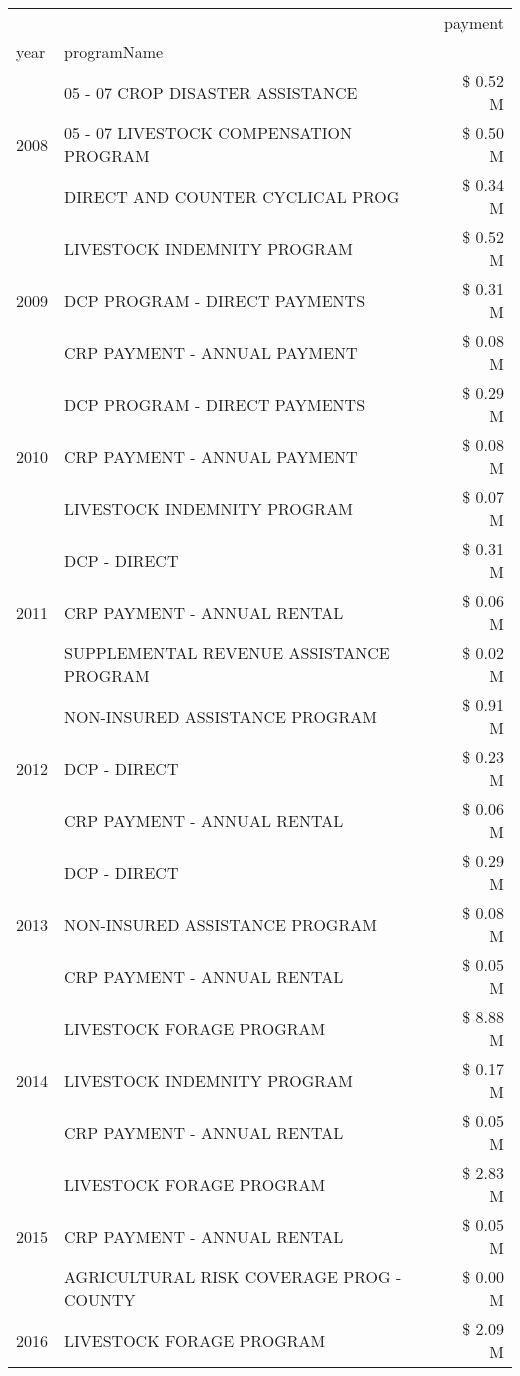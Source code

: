 \begin{tabular}{llr}
\toprule
 &  & payment \\
year & programName &  \\
\midrule
\multirow[t]{3}{*}{2008} & 05 - 07 CROP DISASTER ASSISTANCE & \$ 0.52 M \\
 & 05 - 07 LIVESTOCK COMPENSATION PROGRAM & \$ 0.50 M \\
 & DIRECT AND COUNTER CYCLICAL PROG & \$ 0.34 M \\
\cline{1-3}
\multirow[t]{3}{*}{2009} & LIVESTOCK INDEMNITY PROGRAM & \$ 0.52 M \\
 & DCP PROGRAM - DIRECT PAYMENTS & \$ 0.31 M \\
 & CRP PAYMENT - ANNUAL PAYMENT & \$ 0.08 M \\
\cline{1-3}
\multirow[t]{3}{*}{2010} & DCP PROGRAM - DIRECT PAYMENTS & \$ 0.29 M \\
 & CRP PAYMENT - ANNUAL PAYMENT & \$ 0.08 M \\
 & LIVESTOCK INDEMNITY PROGRAM & \$ 0.07 M \\
\cline{1-3}
\multirow[t]{3}{*}{2011} & DCP - DIRECT & \$ 0.31 M \\
 & CRP PAYMENT - ANNUAL RENTAL & \$ 0.06 M \\
 & SUPPLEMENTAL REVENUE ASSISTANCE PROGRAM & \$ 0.02 M \\
\cline{1-3}
\multirow[t]{3}{*}{2012} & NON-INSURED ASSISTANCE PROGRAM & \$ 0.91 M \\
 & DCP - DIRECT & \$ 0.23 M \\
 & CRP PAYMENT - ANNUAL RENTAL & \$ 0.06 M \\
\cline{1-3}
\multirow[t]{3}{*}{2013} & DCP - DIRECT & \$ 0.29 M \\
 & NON-INSURED ASSISTANCE PROGRAM & \$ 0.08 M \\
 & CRP PAYMENT - ANNUAL RENTAL & \$ 0.05 M \\
\cline{1-3}
\multirow[t]{3}{*}{2014} & LIVESTOCK FORAGE PROGRAM & \$ 8.88 M \\
 & LIVESTOCK INDEMNITY PROGRAM & \$ 0.17 M \\
 & CRP PAYMENT - ANNUAL RENTAL & \$ 0.05 M \\
\cline{1-3}
\multirow[t]{3}{*}{2015} & LIVESTOCK FORAGE PROGRAM & \$ 2.83 M \\
 & CRP PAYMENT - ANNUAL RENTAL & \$ 0.05 M \\
 & AGRICULTURAL RISK COVERAGE PROG - COUNTY & \$ 0.00 M \\
\cline{1-3}
\multirow[t]{3}{*}{2016} & LIVESTOCK FORAGE PROGRAM & \$ 2.09 M \\

\end{tabular}
